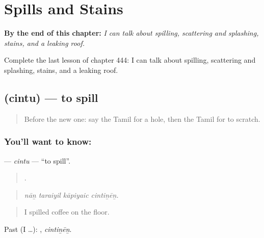 
\chapter{Spills and Stains}
\label{ch:ta-spills-and-stains}

\begin{chapteropening}
\textbf{By the end of this chapter:} \emph{I can talk about spilling, scattering and splashing, stains, and a leaking roof.}

Complete the last lesson of chapter 444: I can talk about spilling, scattering and splashing, stains, and a leaking roof.
\end{chapteropening}

\section[\texorpdfstring{\ta{சிந்து} (cintu)}{சிந்து (cintu)}]{ (cintu) — to spill}

\label{lesson:TA-C444-cintu}



\begin{quote}
Before the new one: say the Tamil for a hole, then the Tamil for to scratch.
\end{quote}

\subsection*{You'll want to know: }
\textbf{} — \emph{cintu} — \textquotedblleft{}to spill\textquotedblright{}.

\begin{quote}
   .
\end{quote}

\begin{quote}
\emph{nāṉ taraiyil kāpiyaic cintiṉēṉ.}
\end{quote}

\begin{quote}
I spilled coffee on the floor.
\end{quote}

Past (I …): , \emph{cintiṉēṉ}.

